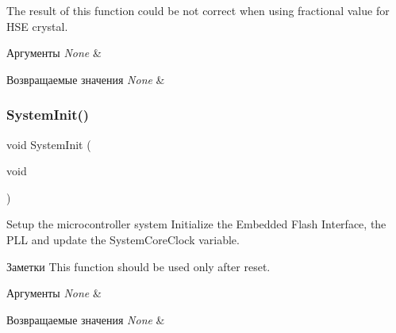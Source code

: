 \begin{DoxyItemize}
\item The result of this function could be not correct when using fractional value for H\+SE crystal. 
\begin{DoxyParams}{Аргументы}
{\em None} & \\
\hline
\end{DoxyParams}

\begin{DoxyRetVals}{Возвращаемые значения}
{\em None} & \\
\hline
\end{DoxyRetVals}

\end{DoxyItemize}\mbox{\label{group___s_t_m32_f10x___system___exported___functions_ga93f514700ccf00d08dbdcff7f1224eb2}} 
\subsubsection{\texorpdfstring{SystemInit()}{SystemInit()}}
{\footnotesize\ttfamily void System\+Init (\begin{DoxyParamCaption}\item[{void}]{ }\end{DoxyParamCaption})}



Setup the microcontroller system Initialize the Embedded Flash Interface, the P\+LL and update the System\+Core\+Clock variable. 

\begin{DoxyNote}{Заметки}
This function should be used only after reset. 
\end{DoxyNote}

\begin{DoxyParams}{Аргументы}
{\em None} & \\
\hline
\end{DoxyParams}

\begin{DoxyRetVals}{Возвращаемые значения}
{\em None} & \\
\hline
\end{DoxyRetVals}
